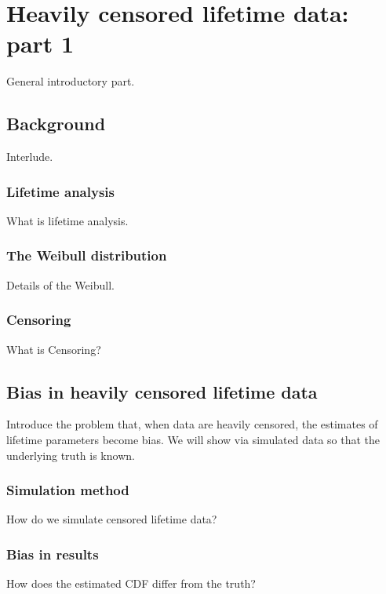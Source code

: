 \chapter{Heavily censored lifetime data: part 1}\label{chap:chapter2}

General introductory part.

\section{Background}

Interlude.

\subsection{Lifetime analysis}

What is lifetime analysis.

\subsection{The Weibull distribution}

Details of the Weibull.

\subsection{Censoring}

What is Censoring?

\section{Bias in heavily censored lifetime data}

Introduce the problem that, when data are heavily censored, the estimates of lifetime parameters become bias. We will show via simulated data so that the underlying truth is known.

\subsection{Simulation method}

How do we simulate censored lifetime data?

\subsection{Bias in results}

How does the estimated CDF differ from the truth?

